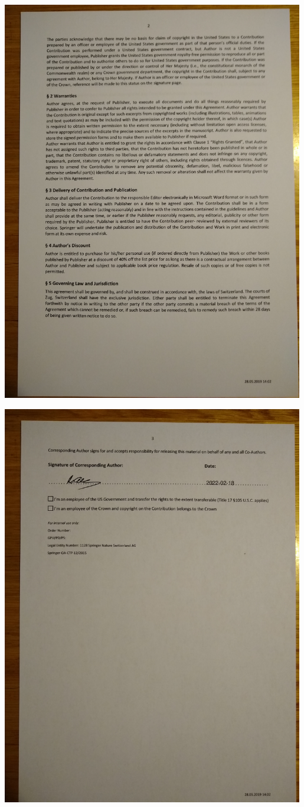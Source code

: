 \documentclass[a4paper]{article}
\begin{document}
\includegraphics[width=0.99\textwidth]{IMG_20220218_100159651.jpg}

\newpage

\includegraphics[width=0.99\textwidth]{IMG_20220218_100213886.jpg}
\end{document}

